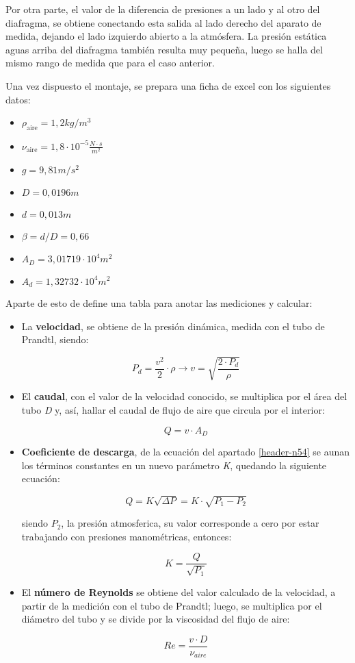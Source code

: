Por otra parte, el valor de la diferencia de presiones a un lado y al
otro del diafragma, se obtiene conectando esta salida al lado derecho
del aparato de medida, dejando el lado izquierdo abierto a la atmósfera.
La presión estática aguas arriba del diafragma también resulta muy
pequeña, luego se halla del mismo rango de medida que para el caso
anterior.

Una vez dispuesto el montaje, se prepara una ficha de excel con los
siguientes datos:

\begin{itemize}
\item
  \(\rho _ {\text{aire}} = 1,2 kg/m^3\)
\item
  \(\nu _ {\text{aire}}=1,8 \cdot 10^{-5} \frac{N\cdot s}{m^2}\)
\item
  \(g=9,81 m/s^2\)
\item
  $D=0,0196 m$
\item
  \(d=0,013m\)
\item
  \(\beta =d/D= 0,66\)
\item
  \(A_D = 3,01719 \cdot 10^4 m^2\)
\item
  \(A_d = 1,32732 \cdot 10^4 m^2\)
\end{itemize}

Aparte de esto de define una tabla para anotar las mediciones y
calcular:

\begin{itemize}
\item
  La \textbf{velocidad}, se obtiene de la presión dinámica, medida con
  el tubo de Prandtl, siendo:

  \[P_d=\frac{v^2}{2}\cdot \rho \to v=\sqrt{\frac{2\cdot P_d}{\rho}}\]
\item
  El \textbf{caudal}, con el valor de la velocidad conocido, se
  multiplica por el área del tubo \emph{D} y, así, hallar el caudal de
  flujo de aire que circula por el interior:

  \[Q=v\cdot A_D\]
\item
  \textbf{Coeficiente de descarga}, de la ecuación del apartado \autoref{header-n54} se aunan los
  términos constantes en un nuevo parámetro \emph{K}, quedando la
  siguiente ecuación:

  \[Q=K\sqrt{\Delta P} = K\cdot \sqrt{P_1-P_2}\]

  siendo \(P_2\), la presión atmosferica, su valor corresponde a cero
  por estar trabajando con presiones manométricas, entonces:

  \[K=\frac{Q}{\sqrt{P_1}}\]
\item
  El \textbf{número de Reynolds} se obtiene del valor calculado de la
  velocidad, a partir de la medición con el tubo de Prandtl; luego, se
  multiplica por el diámetro del tubo y se divide por la viscosidad del
  flujo de aire:

  \[Re= \frac{v\cdot D}{\nu _{aire}}\]
\end{itemize}

